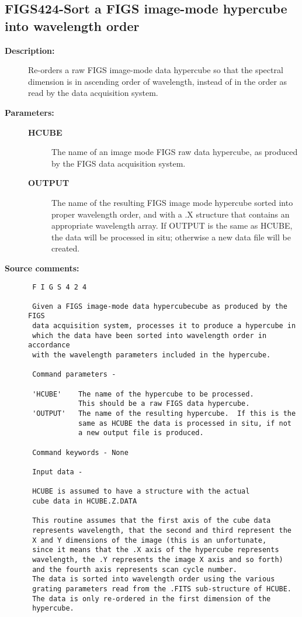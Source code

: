 \subsection{FIGS424-\label{FIGS424}Sort a FIGS image-mode hypercube into wavelength order}
\begin{description}

\item [{\bf Description:}]
 Re-orders a raw FIGS image-mode data hypercube so that the
 spectral dimension is in ascending order of wavelength,
 instead of in the order as read by the data acquisition system.

\item [{\bf Parameters:}]
\begin{description}
\item [{\bf HCUBE}]
 The name of an image mode FIGS raw data hypercube,
 as produced by the FIGS data acquisition system.
\item [{\bf OUTPUT}]
 The name of the resulting FIGS image mode hypercube
 sorted into proper wavelength order, and with a .X
 structure that contains an appropriate wavelength
 array.  If OUTPUT is the same as HCUBE, the data
 will be processed in situ; otherwise a new data file
 will be created.
\end{description}

\item [{\bf Source comments:}]
\begin{verbatim}
 F I G S 4 2 4

 Given a FIGS image-mode data hypercubecube as produced by the FIGS
 data acquisition system, processes it to produce a hypercube in
 which the data have been sorted into wavelength order in accordance
 with the wavelength parameters included in the hypercube.

 Command parameters -

 'HCUBE'    The name of the hypercube to be processed.
            This should be a raw FIGS data hypercube.
 'OUTPUT'   The name of the resulting hypercube.  If this is the
            same as HCUBE the data is processed in situ, if not
            a new output file is produced.

 Command keywords - None

 Input data -

 HCUBE is assumed to have a structure with the actual
 cube data in HCUBE.Z.DATA

 This routine assumes that the first axis of the cube data
 represents wavelength, that the second and third represent the
 X and Y dimensions of the image (this is an unfortunate,
 since it means that the .X axis of the hypercube represents
 wavelength, the .Y represents the image X axis and so forth)
 and the fourth axis represents scan cycle number.
 The data is sorted into wavelength order using the various
 grating parameters read from the .FITS sub-structure of HCUBE.
 The data is only re-ordered in the first dimension of the
 hypercube.


\end{verbatim}
\end{description}
